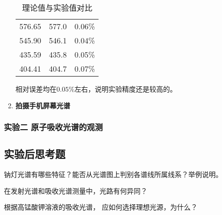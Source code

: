 \documentclass[dvipsnames, svgnames,a4paper,11pt]{article}
\begin{document}
\begin{enumerate}
\begin{table}[htbp]
\begin{tabular}{|c|c|c|}
						576.65 & 577.0  & 0.06\%  \\
						
						545.90 & 546.1  & 0.04\%  \\
						
						435.59 & 435.8  & 0.05\%  \\
						
						404.41 & 404.7  & 0.07\%  \\
						\hline
					\end{tabular}
					\caption{理论值与实验值对比}
					\label{tab:table2}
				\end{table}
				
				相对误差均在$0.05\%$左右，说明实验精度还是较高的。
				
			\item \textbf{拍摄手机屏幕光谱}
				
				
		\end{enumerate}
		

		
	\subsubsection{实验二 原子吸收光谱的观测}
			
			
			
			
\subsection{实验后思考题}



\begin{question}
	 钠灯光谱有哪些特征？能否从光谱图上判别各谱线所属线系？举例说明。
\end{question}
	
	
	
	
	
\begin{question}
	在发射光谱和吸收光谱测量中，光路有何异同？
\end{question}
	
	
	
	
	
	
	
\begin{question}
	根据高锰酸钾溶液的吸收光谱， 应如何选择理想光源，为什么？
\end{question}
	
	
	
	
	
	
	
	
	
\end{document}
